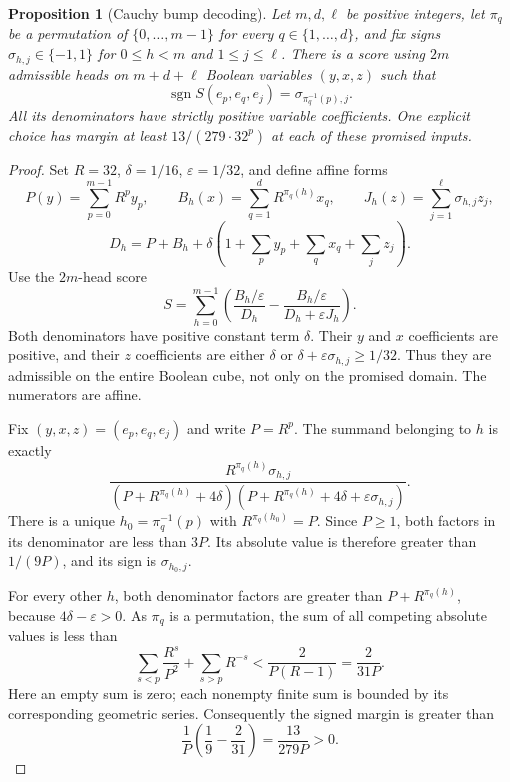 \documentclass[11pt]{article}
\newtheorem{proposition}{Proposition}
\begin{document}
\begin{proposition}[Cauchy bump decoding]
Let $m,d,\ell$ be positive integers, let $\pi_q$ be a permutation of
$\{0,\ldots,m-1\}$ for every $q\in\{1,\ldots,d\}$, and fix signs
$\sigma_{h,j}\in\{-1,1\}$ for $0\le h<m$ and $1\le j\le\ell$.
There is a score using $2m$ admissible heads on $m+d+\ell$ Boolean
variables $(y,x,z)$ such that
\[
 \operatorname{sgn} S(e_p,e_q,e_j)
   =\sigma_{\pi_q^{-1}(p),j}.
\]
All its denominators have strictly positive variable coefficients.
One explicit choice has margin at least $13/(279\cdot32^p)$ at each
of these promised inputs.
\end{proposition}
\begin{proof}
Set $R=32$, $\delta=1/16$, $\varepsilon=1/32$, and define affine forms
\[
 P(y)=\sum_{p=0}^{m-1} R^p y_p,\qquad
 B_h(x)=\sum_{q=1}^d R^{\pi_q(h)}x_q,\qquad
 J_h(z)=\sum_{j=1}^{\ell}\sigma_{h,j}z_j,
\]
\[
 D_h=P+B_h+\delta\left(1+\sum_p y_p+\sum_q x_q+\sum_jz_j\right).
\]
Use the $2m$-head score
\[
 S=\sum_{h=0}^{m-1}\left(
       \frac{B_h/\varepsilon}{D_h}
       -\frac{B_h/\varepsilon}{D_h+\varepsilon J_h}\right).
\]
Both denominators have positive constant term $\delta$. Their $y$ and
$x$ coefficients are positive, and their $z$ coefficients are either
$\delta$ or $\delta+\varepsilon\sigma_{h,j}\ge1/32$. Thus they are
admissible on the entire Boolean cube, not only on the promised domain.
The numerators are affine.

Fix $(y,x,z)=(e_p,e_q,e_j)$ and write $P=R^p$.
The summand belonging to $h$ is exactly
\[
 \frac{R^{\pi_q(h)}\sigma_{h,j}}
 {(P+R^{\pi_q(h)}+4\delta)
  (P+R^{\pi_q(h)}+4\delta+\varepsilon\sigma_{h,j})}.
\]
There is a unique $h_0=\pi_q^{-1}(p)$ with $R^{\pi_q(h_0)}=P$.
Since $P\ge1$, both factors in its denominator are less than $3P$.
Its absolute value is therefore greater than $1/(9P)$, and its sign
is $\sigma_{h_0,j}$.

For every other $h$, both denominator factors are greater than
$P+R^{\pi_q(h)}$, because $4\delta-\varepsilon>0$.
As $\pi_q$ is a permutation, the sum of all competing absolute values
is less than
\[
 \sum_{s<p}\frac{R^s}{P^2}+\sum_{s>p}R^{-s}
 <\frac{2}{P(R-1)}=\frac{2}{31P}.
\]
Here an empty sum is zero; each nonempty finite sum is bounded by its
corresponding geometric series. Consequently the signed margin is
greater than
\[
 \frac1P\left(\frac19-\frac2{31}\right)=\frac{13}{279P}>0.
\]
\end{proof}
\end{document}
